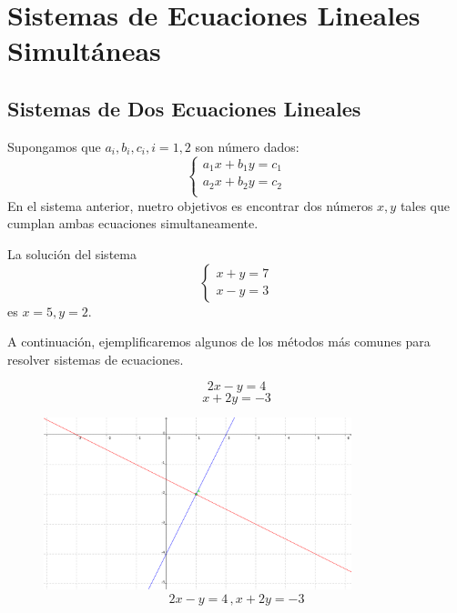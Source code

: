 
\section{Sistemas de Ecuaciones Lineales Simultáneas}

\subsection{Sistemas de Dos Ecuaciones Lineales}

 Supongamos que $a_{i}, b_{i}, c_{i}, i=1,2$ son número dados:
	$$\begin{cases}
		a_{1}x+b_{1}y=c_{1}\\
		a_{2}x+b_{2}y=c_{2}\\
	\end{cases}
	$$
	En el sistema anterior, nuetro objetivos es encontrar dos números $x,y$ tales que cumplan ambas ecuaciones simultaneamente.



	\begin{resuelto}
		La soluci\'on del sistema
		$$\begin{cases}
			x+y=7\\
			x-y=3
		\end{cases}
		$$ es $x=5,y=2.$
	\end{resuelto}




	A continuaci\'on, ejemplificaremos algunos de los m\'etodos más comunes para resolver sistemas de ecuaciones.

%

\begin{resuelto}
	\[
	\label{spi151}
	2x-y=4
	\]
	\[
	\label{spi152}
	x+2y=-3
	\]
\end{resuelto}


\begin{figure}
	\centering
	\includegraphics[height=5cm,keepaspectratio=true]{./precalculo/IM0401.png}
	\caption{$$2x-y=4\, , x+2y=-3$$}
	\label{fig:IM0401}
\end{figure}

